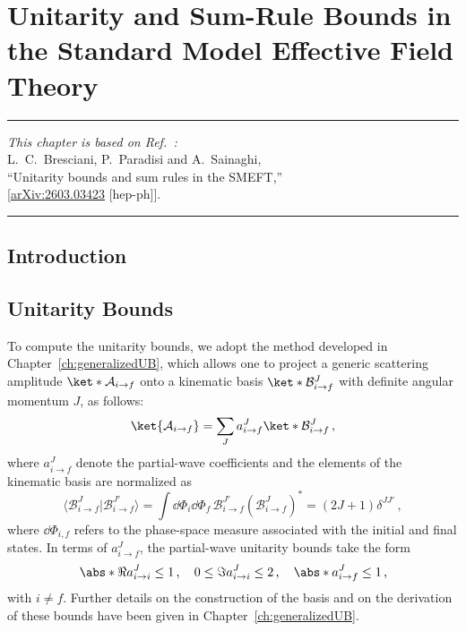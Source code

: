 \chapter{Unitarity and Sum-Rule Bounds in the Standard Model Effective Field Theory\label{ch:SMEFT_bounds}}

\begin{flushright}
\small

{\color{chapterpaperrule}\rule{\textwidth}{0.5pt}}

\textit{This chapter is based on Ref.~\cite{Bresciani:2026acy}:}\\[0.5em]
L.~C.~Bresciani, P.~Paradisi and A.~Sainaghi,\\[0pt]
``Unitarity bounds and sum rules in the SMEFT,''\\[0pt]
[\href{https://doi.org/10.48550/arXiv.2603.03423}{arXiv:2603.03423} [hep-ph]].

{\color{chapterpaperrule}\rule{\textwidth}{0.5pt}}
\end{flushright}

\section{Introduction}

\section{Unitarity Bounds\label{sec:SMEFT_unitaritybounds}}

To compute the unitarity bounds, we adopt the method developed in Chapter~\ref{ch:generalizedUB}, which allows one to project a generic scattering amplitude $\ket*{\mathcal{A}_{i\to f}}$ onto a kinematic basis $\ket*{\mathcal{B}^J_{i\to f}}$ with definite angular momentum $J$, as follows:
\begin{equation}
\ket{\mathcal{A}_{i\to f}}=\sum_J a_{i\to f}^J \ket*{\mathcal{B}_{i\to f}^J}\,,
\end{equation}
where $a_{i\to f}^J$ denote the partial-wave coefficients and the elements of the kinematic basis are normalized as 
\begin{equation}
    \langle \mathcal B^J_{i\to f}|\mathcal B^{J'}_{i\to f}\rangle = \int \dd\Phi_i \dd\Phi_f \, \mathcal B^{J'}_{i\to f} \left(\mathcal B^J_{i\to f}\right)^* = (2J+1)\delta^{JJ'}\,,
\end{equation}
where $\dd\Phi_{i,f}$ refers to the phase-space measure associated with the initial and final states.
In terms of $a_{i\to f}^J$, the partial-wave unitarity bounds 
take the form
%
\begin{equation}\label{unitarity bound general}
\abs*{\Re a_{i\to i}^J}\leq 1\,,
\quad
0\leq \Im a_{i\to i}^J\leq 2\,,
\quad
\abs*{a_{i\to f}^J}\leq 1\,,
\end{equation}
with $i \neq f$.
Further details on the construction of the basis and on the derivation of these bounds have been given in Chapter~\ref{ch:generalizedUB}.

